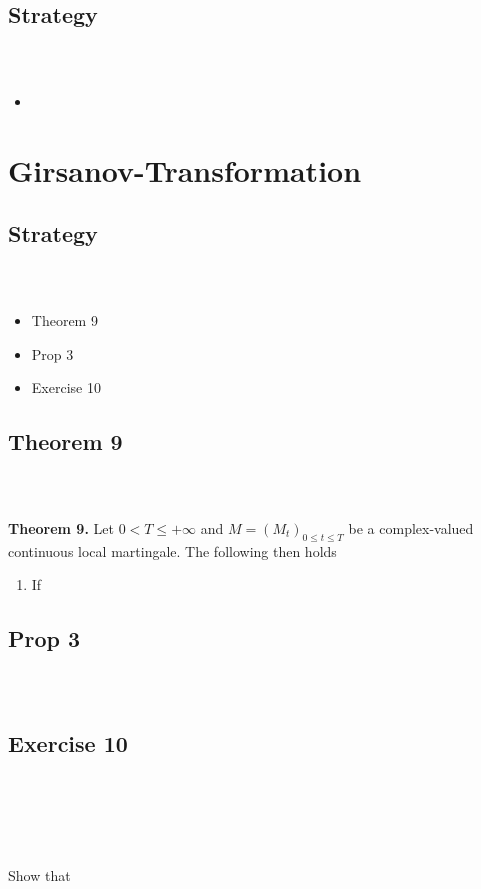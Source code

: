 \documentclass{beamer}
\numberwithin{equation}{section}
\newenvironment{frame2}{\begin{frame}\frametitle{{\normalsize \secname} \\ {\large \subsecname}}}{\end{frame}}
\begin{document}
\subsection{Strategy}
\begin{frame2}
    \begin{itemize}
        \item 
    \end{itemize}
\end{frame2}

\section{Girsanov-Transformation}

\subsection{Strategy}
\begin{frame2}
    \begin{itemize}
        \item Theorem 9
        \item Prop 3
        \item Exercise 10
    \end{itemize}
\end{frame2}

\subsection{Theorem 9}

\begin{frame2}
    \textbf{Theorem 9.}
    Let $0 < T \leq +\infty$ and $M = (M_t)_{0\leq t \leq T}$ be a complex-valued continuous local martingale.
    The following then holds
    \begin{enumerate}
        \item If
    \end{enumerate}
\end{frame2}

\subsection{Prop 3}

\begin{frame2}
    
\end{frame2}

\subsection{Exercise 10}

\begin{frame2}
    
\end{frame2}

\begin{frame2}
    Show that
\end{frame2}
\end{document}
